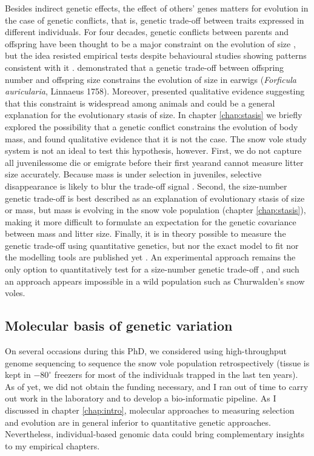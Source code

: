 Besides indirect genetic effects, the effect of others' genes matters for evolution in the case of genetic conflicts, that is, genetic trade-off between traits expressed in different individuals.
For four decades, genetic conflicts between parents and offspring have been thought to be a major constraint on the evolution of size \parencite[since][]{Trivers1974}, but the idea resisted empirical tests despite behavioural studies showing patterns consistent with it \parencite{Kolliker2015}. \cite{Kolliker2015} demonstrated that a genetic trade-off between offspring number and offspring size constrains the evolution of size in earwigs (\textit{Forficula auricularia}, Linnaeus 1758). Moreover, \cite{Rollinson2015b} presented qualitative evidence suggesting that this constraint is widespread among animals and could be a general explanation for the evolutionary stasis of size. 
In chapter \ref{chap:stasis} we briefly explored the possibility that a genetic conflict constrains the evolution of body mass, and found qualitative evidence that it is not the case. The snow vole study system is not an ideal to test this hypothesis, however. First, we do not capture all juveniles\textemdash some die or emigrate before their first year\textemdash and cannot measure litter size accurately. Because mass is under selection in juveniles, selective disappearance is likely to blur the trade-off signal \parencite{Hadfield2011}. Second, the size-number genetic trade-off is best described as an explanation of evolutionary stasis of size or mass, but mass is evolving in the snow vole population (chapter \ref{chap:stasis}), making it more difficult to formulate an expectation for the genetic covariance between mass and litter size. 
Finally, it is in theory possible to measure the genetic trade-off using quantitative genetics, but nor the exact model to fit nor the modelling tools are published yet \parencite{Hadfield2012, Rollinson2015b}. An experimental approach remains the only option to quantitatively test for a size-number genetic trade-off \parencite{Kolliker2015}, and such an approach appears impossible in a wild population such as Churwalden's snow voles. 

\subsection{Molecular basis of genetic variation}
On several occasions during this PhD, we considered using high-throughput genome sequencing \parencite{VanDijk2014} to sequence the snow vole population retrospectively (tissue is kept in $-80^\circ$ freezers for most of the individuals trapped in the last ten years).
As of yet, we did not obtain the funding necessary, and I ran out of time to carry out work in the laboratory and to develop a bio-informatic pipeline. 
As I discussed in chapter \ref{chap:intro}, molecular approaches to measuring selection and evolution are in general inferior to quantitative genetic approaches. Nevertheless, individual-based genomic data could bring complementary insights to my empirical chapters.


